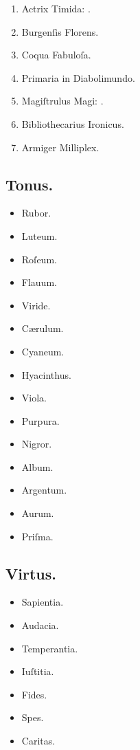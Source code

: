 \documentclass[12pt]{book}
\begin{document}
\begin{enumerate}
  \item Actrix Timida: .
  \item Burgenſis Florens.
  \item Coqua Fabuloſa.
  \item Primaria in Diabolimundo.

  \setcounter{enumi}{495}
  \item Magiſtrulus Magi: .
  \setcounter{enumi}{1000}
  \item Bibliothecarius Ironicus.
  \setcounter{enumi}{1000}
  \item Armiger Milliplex.
\end{enumerate}

\subsection{Tonus.}\label{tonus}

\begin{itemize}
  \item Rubor.
  \item Luteum.
  \item Roſeum.
  \item Flauum.
  \item Viride.
  \item Cærulum.
  \item Cyaneum.
  \item Hyacinthus.
  \item Viola.
  \item Purpura.
  \item Nigror.
  \item Album.
  \item Argentum.
  \item Aurum.
  \item Priſma.
\end{itemize}

\subsection{Virtus.}\label{virtus}

\begin{itemize}
  \item Sapientia.
  \item Audacia.
  \item Temperantia.
  \item Iuſtitia.
  \item Fides.
  \item Spes.
  \item Caritas.
\end{itemize}
\end{document}
